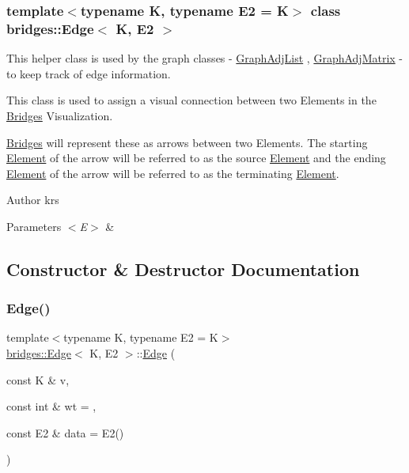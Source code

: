 \subsubsection*{template$<$typename K, typename E2 = K$>$\newline
class bridges\+::\+Edge$<$ K, E2 $>$}

This helper class is used by the graph classes -\/ \mbox{\hyperlink{classbridges_1_1_graph_adj_list}{Graph\+Adj\+List}} , \mbox{\hyperlink{classbridges_1_1_graph_adj_matrix}{Graph\+Adj\+Matrix}} -\/ to keep track of edge information. 

This class is used to assign a visual connection between two Elements in the \mbox{\hyperlink{classbridges_1_1_bridges}{Bridges}} Visualization. 

\mbox{\hyperlink{classbridges_1_1_bridges}{Bridges}} will represent these as arrows between two Elements. The starting \mbox{\hyperlink{classbridges_1_1_element}{Element}} of the arrow will be referred to as the source \mbox{\hyperlink{classbridges_1_1_element}{Element}} and the ending \mbox{\hyperlink{classbridges_1_1_element}{Element}} of the arrow will be referred to as the terminating \mbox{\hyperlink{classbridges_1_1_element}{Element}}.

\begin{DoxyAuthor}{Author}
krs
\end{DoxyAuthor}

\begin{DoxyParams}{Parameters}
{\em $<$\+E$>$} & \\
\hline
\end{DoxyParams}


\subsection{Constructor \& Destructor Documentation}
\mbox{\label{classbridges_1_1_edge_a8a3fc4ec8164fcff2a7fc057d29db8c7}} 
\subsubsection{\texorpdfstring{Edge()}{Edge()}}
{\footnotesize\ttfamily template$<$typename K, typename E2 = K$>$ \\
\mbox{\hyperlink{classbridges_1_1_edge}{bridges\+::\+Edge}}$<$ K, E2 $>$\+::\mbox{\hyperlink{classbridges_1_1_edge}{Edge}} (\begin{DoxyParamCaption}\item[{const K \&}]{v,  }\item[{const int \&}]{wt = {},  }\item[{const E2 \&}]{data = {\ttfamily E2()} }\end{DoxyParamCaption})\hspace{0.3cm}{\ttfamily [inline]}}

